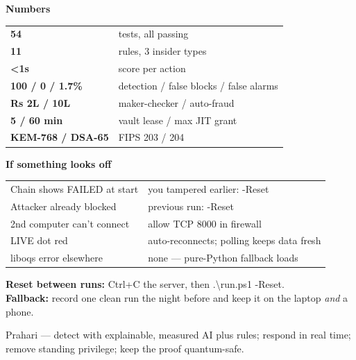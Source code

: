 \documentclass[11pt]{article}
\newcommand{\code}[1]{{\ttfamily\color{navy2}#1}}
\begin{document}
\begin{minipage}[t]{0.48\textwidth}
\textbf{\color{navy}Numbers}\par\small
\begin{tabular}{L{1.9cm} L{4.0cm}}
\toprule
\textbf{54} & tests, all passing \\
\textbf{11} & rules, 3 insider types \\
\textbf{<1s} & score per action \\
\textbf{100 / 0 / 1.7\%} & detection / false blocks / false alarms \\
\textbf{Rs 2L / 10L} & maker-checker / auto-fraud \\
\textbf{5 / 60 min} & vault lease / max JIT grant \\
\textbf{KEM-768 / DSA-65} & FIPS 203 / 204 \\
\bottomrule
\end{tabular}
\end{minipage}\hfill
\begin{minipage}[t]{0.48\textwidth}
\textbf{\color{navy}If something looks off}\par\small
\begin{tabular}{L{3.0cm} L{3.3cm}}
\toprule
Chain shows FAILED at start & you tampered earlier: \code{-Reset} \\
Attacker already blocked & previous run: \code{-Reset} \\
2nd computer can't connect & allow TCP 8000 in firewall \\
LIVE dot red & auto-reconnects; polling keeps data fresh \\
liboqs error elsewhere & none — pure-Python fallback loads \\
\bottomrule
\end{tabular}
\end{minipage}

\vspace{10pt}
\begin{tipbox}
\textbf{Reset between runs:} Ctrl+C the server, then \code{.\textbackslash run.ps1 -Reset}.\\
\textbf{Fallback:} record one clean run the night before and keep it on the laptop \emph{and} a phone.
\end{tipbox}

\vfill
\begin{center}\small\color{muted}
Prahari — detect with explainable, measured AI plus rules; respond in real time; remove standing privilege;
keep the proof quantum-safe.
\end{center}
\end{document}
